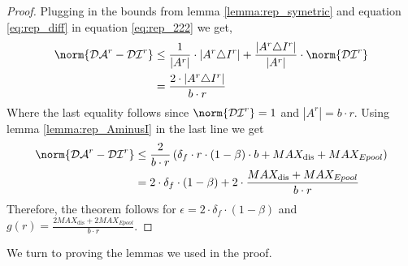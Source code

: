 \begin{proof}
Plugging in the bounds from lemma \ref{lemma:rep_symetric} and equation \ref{eq:rep_diff} in equation \ref{eq:rep_222} we get,
\begin{equation}\begin{split} 
\norm{\mathcal{DA}^r-\mathcal{DI}^{r}} 
& \leq \frac{1}{|A^r|} \cdot \left | A^r \triangle I^{r} \right | + \frac{\left | A^r \triangle I^{r} \right |}{|A^r|} \cdot \norm{\mathcal {DI}^{r} }\\
& =\frac{2\cdot | A^r \triangle I^{r}|}{b\cdot r}
\end{split}\end{equation}
Where the last equality follows since $\norm{\mathcal{DI}^r}=1$ and $\left| A^r \right|=b\cdot r$.
Using lemma \ref{lemma:rep_AminusI} in the last line we get
\begin{equation}\begin{split}
\norm{\mathcal{DA}^r-\mathcal{DI}^{r}}
& \leq \frac{2}{b\cdot r} \left(\delta_f\cdot r \cdot (1-\beta)\cdot b+MAX_\text{dis}+ MAX_{Epool}\right)\\
&=2\cdot \delta_f\cdot (1-\beta)+2\cdot \frac{MAX_\text{dis}+ MAX_{Epool}}{b\cdot r}
\end{split}\end{equation}
Therefore, the theorem follows for $\epsilon =2\cdot \delta_f\cdot (1-\beta)$ and $g(r)=\frac{2MAX_\text{dis}+ 2MAX_{Epool}}{b\cdot r}$.
\end{proof}
We turn to proving the lemmas we used in the proof. 
